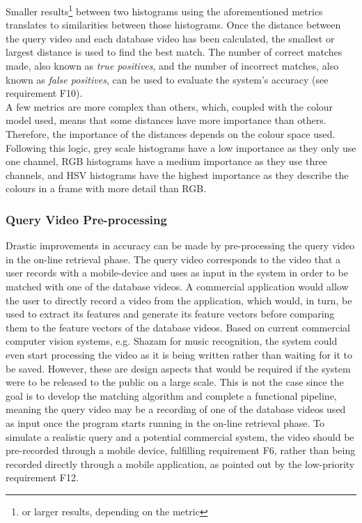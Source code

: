 Smaller results\footnote{or larger results, depending on the metric} between two histograms using the aforementioned metrics translates to similarities between those histograms. Once the distance between the query video and each database video has been calculated, the smallest or largest distance is used to find the best match. The number of correct matches made, also known as \textit{true positives}, and the number of incorrect matches, also known as \textit{false positives}, can be used to evaluate the system's accuracy (see requirement F10).\\

A few metrics are more complex than others, which, coupled with the colour model used, means that some distances have more importance than others. Therefore, the importance of the distances depends on the colour space used. Following this logic, grey scale histograms have a low importance as they only use one channel, RGB histograms have a medium importance as they use three channels, and HSV histograms have the highest importance as they describe the colours in a frame with more detail than RGB.


\subsubsection{Query Video Pre-processing}
\label{sec:design-query-video-processing}

Drastic improvements in accuracy can be made by pre-processing the query video in the on-line retrieval phase. The query video corresponds to the video that a user records with a mobile-device and uses as input in the system in order to be matched with one of the database videos. A commercial application would allow the user to directly record a video from the application, which would, in turn, be used to extract its features and generate its feature vectors before comparing them to the feature vectors of the database videos. Based on current commercial computer vision systems, e.g. Shazam for music recognition, the system could even start processing the video as it is being written rather than waiting for it to be saved. However, these are design aspects that would be required if the system were to be released to the public on a large scale. This is not the case since the goal is to develop the matching algorithm and complete a functional pipeline, meaning the query video may be a recording of one of the database videos used as input once the program starts running in the on-line retrieval phase. To simulate a realistic query and a potential commercial system, the video should be pre-recorded through a mobile device, fulfilling requirement F6, rather than being recorded directly through a mobile application, as pointed out by the low-priority requirement F12.\\

